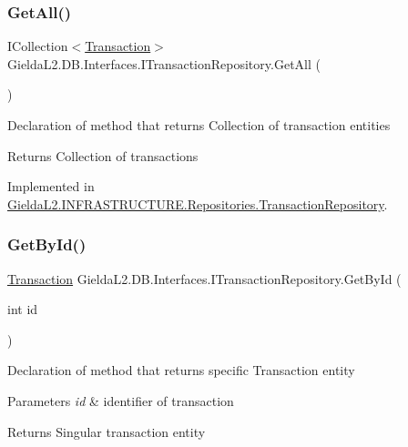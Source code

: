 \subsubsection{\texorpdfstring{GetAll()}{GetAll()}}
{\footnotesize\ttfamily I\+Collection$<$\mbox{\hyperlink{class_gielda_l2_1_1_d_b_1_1_entities_1_1_transaction}{Transaction}}$>$ Gielda\+L2.\+D\+B.\+Interfaces.\+I\+Transaction\+Repository.\+Get\+All (\begin{DoxyParamCaption}{ }\end{DoxyParamCaption})}



Declaration of method that returns Collection of transaction entities 

\begin{DoxyReturn}{Returns}
Collection of transactions
\end{DoxyReturn}


Implemented in \mbox{\hyperlink{class_gielda_l2_1_1_i_n_f_r_a_s_t_r_u_c_t_u_r_e_1_1_repositories_1_1_transaction_repository_ac6358b55acc0931a286b83417c937aa2}{Gielda\+L2.\+I\+N\+F\+R\+A\+S\+T\+R\+U\+C\+T\+U\+R\+E.\+Repositories.\+Transaction\+Repository}}.

\mbox{\label{interface_gielda_l2_1_1_d_b_1_1_interfaces_1_1_i_transaction_repository_a40ecc5e312af4137c8fe31276d8dda45}} 
\subsubsection{\texorpdfstring{GetById()}{GetById()}}
{\footnotesize\ttfamily \mbox{\hyperlink{class_gielda_l2_1_1_d_b_1_1_entities_1_1_transaction}{Transaction}} Gielda\+L2.\+D\+B.\+Interfaces.\+I\+Transaction\+Repository.\+Get\+By\+Id (\begin{DoxyParamCaption}\item[{int}]{id }\end{DoxyParamCaption})}



Declaration of method that returns specific Transaction entity 


\begin{DoxyParams}{Parameters}
{\em id} & identifier of transaction\\
\hline
\end{DoxyParams}
\begin{DoxyReturn}{Returns}
Singular transaction entity
\end{DoxyReturn}


